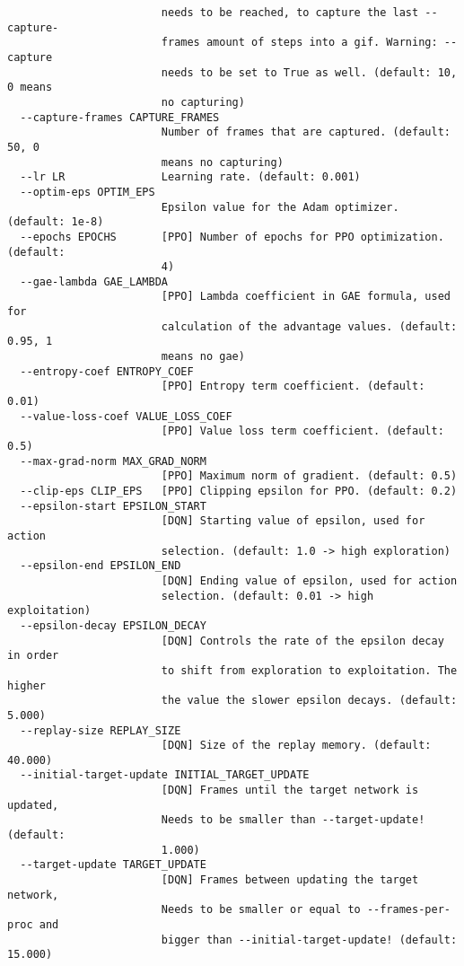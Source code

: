 {\begin{verbatim}
                        needs to be reached, to capture the last --capture-
                        frames amount of steps into a gif. Warning: --capture
                        needs to be set to True as well. (default: 10, 0 means
                        no capturing)
  --capture-frames CAPTURE_FRAMES
                        Number of frames that are captured. (default: 50, 0
                        means no capturing)
  --lr LR               Learning rate. (default: 0.001)
  --optim-eps OPTIM_EPS
                        Epsilon value for the Adam optimizer. (default: 1e-8)
  --epochs EPOCHS       [PPO] Number of epochs for PPO optimization. (default:
                        4)
  --gae-lambda GAE_LAMBDA
                        [PPO] Lambda coefficient in GAE formula, used for
                        calculation of the advantage values. (default: 0.95, 1
                        means no gae)
  --entropy-coef ENTROPY_COEF
                        [PPO] Entropy term coefficient. (default: 0.01)
  --value-loss-coef VALUE_LOSS_COEF
                        [PPO] Value loss term coefficient. (default: 0.5)
  --max-grad-norm MAX_GRAD_NORM
                        [PPO] Maximum norm of gradient. (default: 0.5)
  --clip-eps CLIP_EPS   [PPO] Clipping epsilon for PPO. (default: 0.2)
  --epsilon-start EPSILON_START
                        [DQN] Starting value of epsilon, used for action
                        selection. (default: 1.0 -> high exploration)
  --epsilon-end EPSILON_END
                        [DQN] Ending value of epsilon, used for action
                        selection. (default: 0.01 -> high exploitation)
  --epsilon-decay EPSILON_DECAY
                        [DQN] Controls the rate of the epsilon decay in order
                        to shift from exploration to exploitation. The higher
                        the value the slower epsilon decays. (default: 5.000)
  --replay-size REPLAY_SIZE
                        [DQN] Size of the replay memory. (default: 40.000)
  --initial-target-update INITIAL_TARGET_UPDATE
                        [DQN] Frames until the target network is updated,
                        Needs to be smaller than --target-update! (default:
                        1.000)
  --target-update TARGET_UPDATE
                        [DQN] Frames between updating the target network,
                        Needs to be smaller or equal to --frames-per-proc and
                        bigger than --initial-target-update! (default: 15.000)
    \end{verbatim}
}



